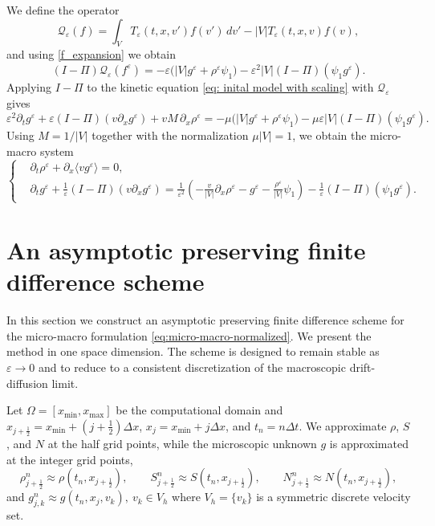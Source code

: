 \documentclass[11pt,twoside]{article}
\numberwithin{equation}{section}
\theoremstyle{plain}
\theoremstyle{nonumberplain}
\begin{document}
{{We define the operator
\[
\mathcal{Q}_\varepsilon(f)
=
\int_V T_\varepsilon(t,x,v')f(v')\,dv'
-
|V|T_\varepsilon(t,x,v)f(v),
\]
and using \eqref{f_expansion} we obtain
\[
(I-\Pi)\mathcal Q_\varepsilon(f^\varepsilon)
=
-\varepsilon\bigl(|V|g^\varepsilon+\rho^\varepsilon\psi_1\bigr)
-\varepsilon^2|V|(I-\Pi)(\psi_1g^\varepsilon).
\]
Applying \(I-\Pi\) {to the kinetic equation \eqref{eq: inital model with scaling}} with
\(\mathcal Q_\varepsilon\) gives
\[
\varepsilon^2 \partial_t g^\varepsilon
+
\varepsilon (I-\Pi)(v\partial_x g^\varepsilon)
+
vM\,\partial_x \rho^\varepsilon
=
-\mu\bigl(|V|g^\varepsilon+\rho^\varepsilon\psi_1\bigr)
-\mu\varepsilon |V|(I-\Pi)(\psi_1g^\varepsilon).
\]
Using \(M=1/|V|\) together with the normalization \(\mu |V|=1\), we obtain
the micro-macro system
\begin{equation}\label{eq:micro-macro-normalized}
\left\{
\begin{aligned}
&\partial_t \rho^\varepsilon
+\partial_x \langle v g^\varepsilon\rangle = 0,\\
&\partial_t g^\varepsilon
+\frac1\varepsilon (I-\Pi)(v\partial_x g^\varepsilon)
=
\frac1{\varepsilon^2}
\left(
-\frac{v}{|V|}\partial_x \rho^\varepsilon
-g^\varepsilon
-\frac{\rho^\varepsilon}{|V|}\psi_1
\right)
-\frac1\varepsilon (I-\Pi)(\psi_1g^\varepsilon).
\end{aligned}
\right.
\end{equation}

}





{
\section{An asymptotic preserving finite difference scheme}
\label{sec:scheme}

In this section we construct an asymptotic preserving finite difference
scheme for the micro-macro formulation \eqref{eq:micro-macro-normalized}. We present the method in one space dimension. The scheme is
designed to remain stable as \(\varepsilon\to0\) and to reduce to a
consistent discretization of the macroscopic drift-diffusion limit.

Let $\Omega = [x_{\min}, x_{\max}]$ be the computational domain and \(x_{j+\frac12}=x_{\min}+(j+\frac12)\Delta x\),
\(x_j=x_{\min}+j\Delta x\), and \(t_n=n\Delta t\). We approximate
\(\rho\), \(S\), and \(N\) at the half grid points, while the microscopic
unknown \(g\) is approximated at the integer grid points,
\[
\rho_{j+\frac12}^n\approx \rho(t_n,x_{j+\frac12}),\qquad
S_{j+\frac12}^n\approx S(t_n,x_{j+\frac12}),\qquad
N_{j+\frac12}^n\approx N(t_n,x_{j+\frac12}),
\]
and $
g_{j,k}^n\approx g(t_n,x_j,v_k),\ v_k\in V_h $ where \(V_h=\{v_k\}\) is a symmetric discrete velocity set.

}}
\end{document}
